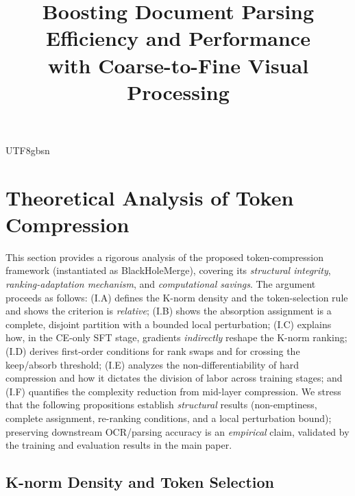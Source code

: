 \documentclass[10pt,twocolumn,letterpaper]{article}
\title{Boosting Document Parsing Efficiency and Performance \\ with Coarse-to-Fine Visual Processing}
\newcommand{\ours}{BlackHoleMerge}
\begin{document}
\begin{CJK}{UTF8}{gbsn}



%     
% 
% 
% 
%     
%     

\clearpage
\setcounter{page}{1}
\setcounter{section}{0}
\setcounter{table}{0}
\setcounter{figure}{0}
\renewcommand{\thesection}{\Roman{section}}
\renewcommand{\thetable}{S\arabic{table}}
\renewcommand{\thefigure}{S\arabic{figure}}

\section{Theoretical Analysis of Token Compression}
\label{sec:supp_derivation}

This section provides a rigorous analysis of the proposed token-compression
framework (instantiated as \ours{}), covering its
\emph{structural integrity}, \emph{ranking-adaptation mechanism}, and
\emph{computational savings}. The argument proceeds as follows:
(I.A) defines the K-norm density and the token-selection rule and shows the
criterion is \emph{relative}; (I.B) shows the absorption assignment is a
complete, disjoint partition with a bounded local perturbation; (I.C) explains
how, in the CE-only SFT stage, gradients \emph{indirectly} reshape the K-norm
ranking; (I.D) derives first-order conditions for rank swaps and for crossing the
keep/absorb threshold; (I.E) analyzes the non-differentiability of hard
compression and how it dictates the division of labor across training stages;
and (I.F) quantifies the complexity reduction from mid-layer compression.
We stress that the following propositions establish \emph{structural} results
(non-emptiness, complete assignment, re-ranking conditions, and a local
perturbation bound); preserving downstream OCR/parsing accuracy is an
\emph{empirical} claim, validated by the training and evaluation results in the
main paper.

\subsection{K-norm Density and Token Selection}


\end{CJK}
\end{document}
